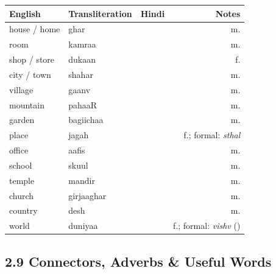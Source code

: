 \begin{tabular}{@{}VTDN@{}}
  \toprule
  English & Transliteration & Hindi & Notes \\
  \midrule
  house / home  & ghar       &         & m. \\
  room          & kamraa     &       & m. \\
  shop / store  & dukaan     &      & f. \\
  city / town   & shahar     &        & m. \\
  village       & gaanv      &       & m. \\
  mountain      & pahaaR     &      & m. \\
  garden        & bagiichaa   &      & m. \\
  place         & jagah      &        & f.; formal: \textit{sthal} \\
  office        & aafis      &       & m. \\
  school        & skuul      &      & m. \\
  temple        & mandir     &      & m. \\
  church        & girjaaghar &    & m. \\
  country       & desh       &        & m. \\
  world         & duniyaa    &     & f.; formal: \textit{vishv} () \\
  \bottomrule
\end{tabular}

\subsection{2.9 Connectors, Adverbs \& Useful Words}

